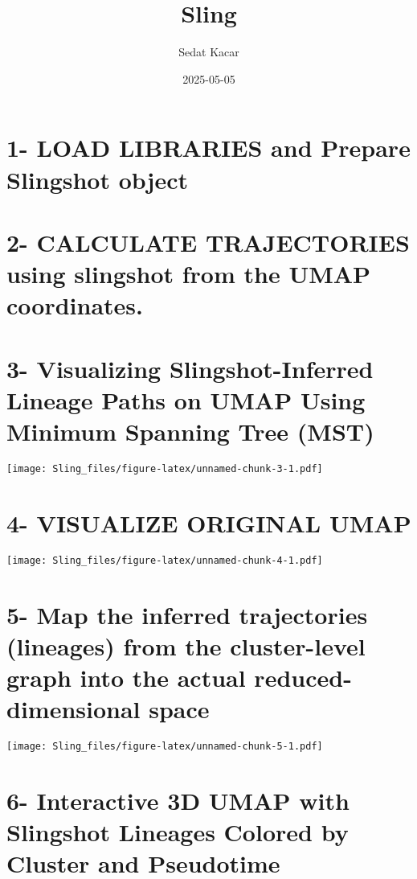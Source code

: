\documentclass[
]{article}
\title{Sling}
\author{Sedat Kacar}
\date{2025-05-05}
\begin{document}
\maketitle

\section{1- LOAD LIBRARIES and Prepare Slingshot
object}\label{load-libraries-and-prepare-slingshot-object}

\section{2- CALCULATE TRAJECTORIES using slingshot from the UMAP
coordinates.}\label{calculate-trajectories-using-slingshot-from-the-umap-coordinates.}

\section{3- Visualizing Slingshot-Inferred Lineage Paths on UMAP Using
Minimum Spanning Tree
(MST)}\label{visualizing-slingshot-inferred-lineage-paths-on-umap-using-minimum-spanning-tree-mst}

\texttt{[image: Sling\_files/figure-latex/unnamed-chunk-3-1.pdf]}

\section{4- VISUALIZE ORIGINAL UMAP}\label{visualize-original-umap}

\texttt{[image: Sling\_files/figure-latex/unnamed-chunk-4-1.pdf]}

\section{5- Map the inferred trajectories (lineages) from the
cluster-level graph into the actual reduced-dimensional
space}\label{map-the-inferred-trajectories-lineages-from-the-cluster-level-graph-into-the-actual-reduced-dimensional-space}

\texttt{[image: Sling\_files/figure-latex/unnamed-chunk-5-1.pdf]}

\section{6- Interactive 3D UMAP with Slingshot Lineages Colored by
Cluster and
Pseudotime}\label{interactive-3d-umap-with-slingshot-lineages-colored-by-cluster-and-pseudotime}
\end{document}
